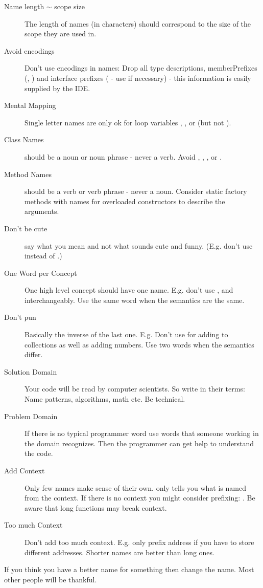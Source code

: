 \documentclass[a4paper, twocolumn]{article}
\newcommand{\code}[1]{\texttt{\color{black}{#1}}}
\begin{document}
\begin{description}
	\item[Name length $\sim$ scope size] The length of names (in characters) should correspond to the size of the scope they are used in.
	\item[Avoid encodings] Don't use encodings in names: Drop all type descriptions, memberPrefixes (\code{m...}, \code{m\_...}) and interface prefixes (\code{I...} - use \code{...Imp} if necessary) - this information is easily supplied by the IDE.
	\item[Mental Mapping] Single letter names are only ok for loop variables \code{i}, \code{j}, or \code{k} (but not \code{l}).
	\item[Class Names] should be a noun or noun phrase - never a verb. Avoid \code{Manager}, \code{Processor}, \code{Data}, or \code{Info}.
	\item[Method Names] should be a verb or verb phrase - never a noun. Consider static factory methods with names for overloaded constructors to describe the arguments.
	\item[Don't be cute] say what you mean and not what sounds cute and funny. (E.g. don't use \code{eatMyShorts} instead of \code{abort()}.)
	\item[One Word per Concept] One high level concept should have one name. E.g. don't use \code{get}, \code{fetch} and \code{retrieve} interchangeably. Use the same word when the semantics are the same.
	\item[Don't pun] Basically the inverse of the last one. E.g. Don't use \code{add} for adding to collections as well as adding numbers. Use two words when the semantics differ.
	\item[Solution Domain] Your code will be read by computer scientists. So write in their terms: Name patterns, algorithms, math etc. Be technical.
	\item[Problem Domain] If there is no typical programmer word use words that someone working in the domain recognizes. Then the programmer can get help to understand the code.
	\item[Add Context] Only few names make sense of their own. \code{name} only tells you what is named from the context. If there is no context you might consider prefixing: \code{bookName}. Be aware that long functions may break context.
	\item[Too much Context] Don't add too much context. E.g. only prefix address if you have to store different addresses. Shorter names are better than long ones.
\end{description}
If you think you have a better name for something then change the name. Most other people will be thankful.
\end{document}
